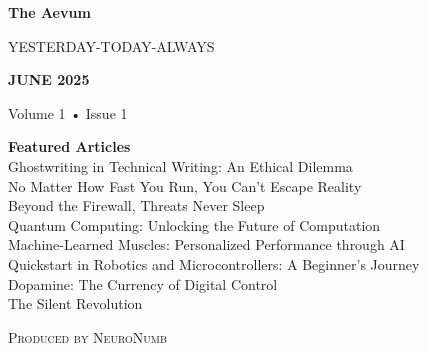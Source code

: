\documentclass[a4paper,10pt,twocolumn]{memoir}
\begin{document}
\begin{titlingpage}
\thispagestyle{empty}
\begin{center}
\vspace*{1.5cm}
{\fontsize{42}{50}\selectfont\bfseries\color{primary}The Aevum}
\vspace{0.5cm}

{\Large\scshape\color{accent}YESTERDAY-TODAY-ALWAYS}
\vspace{1.5cm}

\vspace{1cm}

{\Huge\bfseries\color{dark}JUNE 2025}
\vspace{0.2cm}

{\large Volume 1 • Issue 1}
\vfill

{\large\bfseries Featured Articles}\\[0.5em]
{\color{dark}
Ghostwriting in Technical Writing: An Ethical Dilemma \\
No Matter How Fast You Run, You Can’t Escape Reality\\
Beyond the Firewall, Threats Never Sleep\\
Quantum Computing: Unlocking the Future of Computation\\
Machine-Learned Muscles: Personalized Performance through AI\\
Quickstart in Robotics and Microcontrollers: A Beginner's Journey\\
Dopamine: The Currency of Digital Control}\\
The Silent Revolution
\vfill

{\small\scshape\color{gray}Produced by NeuroNumb}
\end{center}
\end{titlingpage}

\clearpage
\tableofcontents*
\thispagestyle{empty}
\clearpage
\newpage


\end{document}

